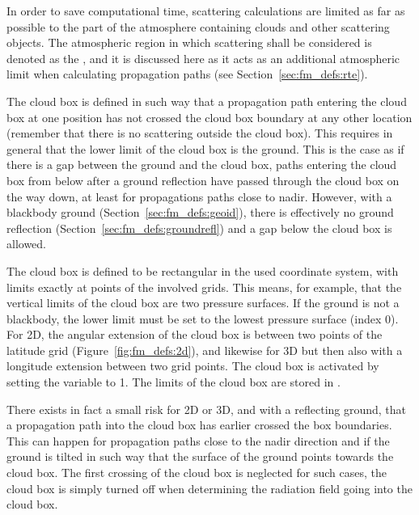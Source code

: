 \label{sec:fm_defs:cloudbox}

In order to save computational time, scattering calculations are
limited as far as possible to the part of the atmosphere containing
clouds and other scattering objects. The atmospheric region in which
scattering shall be considered is denoted as the ,
and it is discussed here as it acts as an additional atmospheric limit
when calculating propagation paths (see
Section~\ref{sec:fm_defs:rte}).

The cloud box is defined in such way that a propagation path entering
the cloud box at one position has not crossed the cloud box boundary
at any other location (remember that there is no scattering outside
the cloud box). This requires in general that the lower limit of the
cloud box is the ground. This is the case as if there is a gap between
the ground and the cloud box, paths entering the cloud box from below
after a ground reflection have passed through the cloud box on the way
down, at least for propagations paths close to nadir. However, with a
blackbody ground (Section~\ref{sec:fm_defs:geoid}), there is
effectively no ground reflection
(Section~\ref{sec:fm_defs:groundrefl}) and a gap below the cloud box
is allowed.

The cloud box is defined to be rectangular in the used coordinate
system, with limits exactly at points of the involved grids. This
means, for example, that the vertical limits of the cloud box are two
pressure surfaces. If the ground is not a blackbody, the lower limit
must be set to the lowest pressure surface (index 0). For 2D, the
angular extension of the cloud box is between two points of the
latitude grid (Figure~\ref{fig:fm_defs:2d}), and likewise for 3D but
then also with a longitude extension between two grid points. The cloud
box is activated by setting the variable  to 1. The
limits of the cloud box are stored in .

There exists in fact a small risk for 2D or 3D, and with a reflecting
ground, that a propagation path into the cloud box has earlier crossed
the box boundaries. This can happen for propagation paths close to the
nadir direction and if the ground is tilted in such way that the
surface of the ground points towards the cloud box. The first crossing
of the cloud box is neglected for such cases, the cloud box is simply
turned off when determining the radiation field going into the cloud
box.


